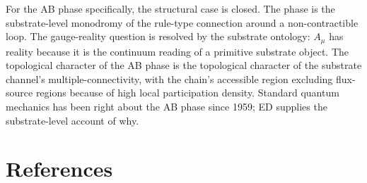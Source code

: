 \documentclass[11pt,a4paper]{article}
\begin{document}
For the AB phase specifically, the structural case is closed. The phase is the substrate-level monodromy of the rule-type connection around a non-contractible loop. The gauge-reality question is resolved by the substrate ontology: $A_\mu$ has reality because it is the continuum reading of a primitive substrate object. The topological character of the AB phase is the topological character of the substrate channel's multiple-connectivity, with the chain's accessible region excluding flux-source regions because of high local participation density. Standard quantum mechanics has been right about the AB phase since 1959; ED supplies the substrate-level account of why.

\section*{References}
\end{document}
